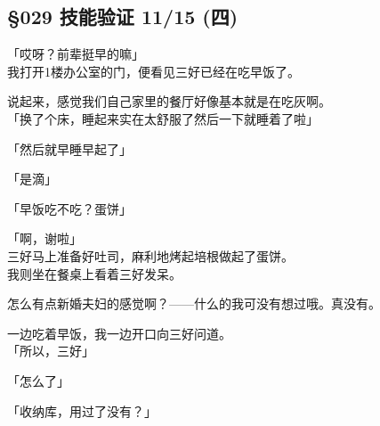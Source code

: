 \subsection{§029 技能验证 11/15 (四)}

「哎呀？前辈挺早的嘛」\\

我打开1楼办公室的门，便看见三好已经在吃早饭了。

说起来，感觉我们自己家里的餐厅好像基本就是在吃灰啊。\\

「换了个床，睡起来实在太舒服了然后一下就睡着了啦」

「然后就早睡早起了」

「是滴」

「早饭吃不吃？蛋饼」

「啊，谢啦」\\

三好马上准备好吐司，麻利地烤起培根做起了蛋饼。\\

我则坐在餐桌上看着三好发呆。

怎么有点新婚夫妇的感觉啊？——什么的我可没有想过哦。真没有。

一边吃着早饭，我一边开口向三好问道。\\

「所以，三好」

「怎么了」

「收纳库，用过了没有？」


